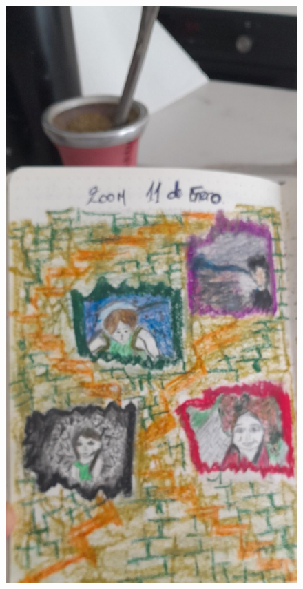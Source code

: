 \documentclass[12pt, a4paper, twoside]{book} %
\begin{document}
\begin{figure}[H]
	\centering
	\includegraphics[width=\textwidth]{./images/1f81324ddf1fdd.jpg}
\end{figure}
\end{document}
